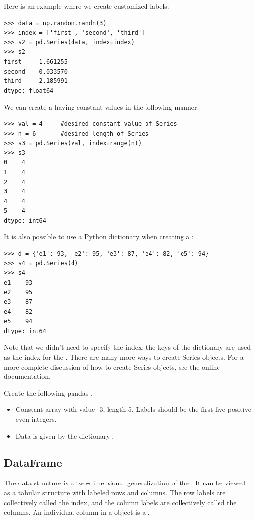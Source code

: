 Here is an example where we create customized labels:
\begin{lstlisting}
>>> data = np.random.randn(3)
>>> index = ['first', 'second', 'third']
>>> s2 = pd.Series(data, index=index)
>>> s2
first     1.661255
second   -0.033570
third    -2.185991
dtype: float64
\end{lstlisting}

We can create a  having constant values in the following manner:
\begin{lstlisting}
>>> val = 4     #desired constant value of Series
>>> n = 6       #desired length of Series
>>> s3 = pd.Series(val, index=range(n))
>>> s3
0    4
1    4
2    4
3    4
4    4
5    4
dtype: int64
\end{lstlisting}

It is also possible to use a Python dictionary when creating a :
\begin{lstlisting}
>>> d = {'e1': 93, 'e2': 95, 'e3': 87, 'e4': 82, 'e5': 94}
>>> s4 = pd.Series(d)
>>> s4
e1    93
e2    95
e3    87
e4    82
e5    94
dtype: int64
\end{lstlisting}
Note that we didn't need to specify the index: the keys of the dictionary are used as the index for the .
There are many more ways to create Series objects.
For a more complete discussion of how to create Series objects, see the online documentation.

\begin{problem}
Create the following pandas .

\begin{itemize}
\item Constant array with value -3, length 5. Labels should be the first five positive even integers.

\item Data is given by the dictionary .
\end{itemize}
\end{problem}

\subsection*{DataFrame}
The  data structure is a two-dimensional generalization of the . It can be viewed
as a tabular structure with labeled rows and columns. The row labels are collectively called the
index, and the column labels are collectively called the columns. An individual column in a
 object is a .


